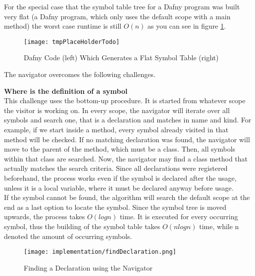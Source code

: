 For the special case that the symbol table tree for a Dafny program was built very flat
(a Dafny program, which only uses the default scope with a main method)
the worst case runtime is still $O(n)$ as you can see in figure \ref{fig:impl_symboltablenav_o_of_n}.

\begin{figure}[H]
    \centering
    \texttt{[image: tmpPlaceHolderTodo]}
    \caption{Dafny Code (left) Which Generates a Flat Symbol Table (right)}
    \label{fig:impl_symboltablenav_o_of_n}
\end{figure}

The navigator overcomes the following challenges.


\textbf{Where is the definition of a symbol}\\
This challenge uses the bottom-up procedure.
It is started from whatever scope the visitor is working on.
In every scope, the navigator will iterate over all symbols and search one, that is a declaration and matches in name and kind.
For example, if we start inside a method, every symbol already visited in that method will be checked.
If no matching declaration was found, the navigator will move to the parent of the method, which must be a class.
Then, all symbols within that class are searched.
Now, the navigator may find a class method that actually matches the search criteria.
Since all declarations were registered beforehand, the process works even if the symbol is declared after the usage, unless it is a local variable, where it must be declared anyway before usage.\\

If the symbol cannot be found, the algorithm will search the default scope at the end as a last option to locate the symbol.
Since the symbol tree is moved upwards, the process takes $O(logn)$ time.
It is executed for every occurring symbol, thus the building of the symbol table takes $O(nlogn)$ time, while n denoted the amount of occurring symbols.\\

\begin{figure}[h]
    \centering
    \texttt{[image: implementation/findDeclaration.png]}
    \caption{Finding a Declaration using the Navigator}
    \label{fig:findDecl}
\end{figure}

